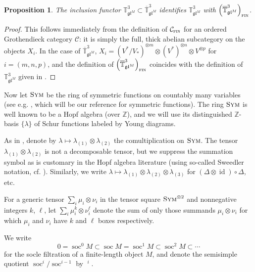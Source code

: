\documentclass[11pt]{article}
\theoremstyle{plain}
\newtheorem{proposition}[lemma]{Proposition}
\theoremstyle{nonumberplain}
\theoremstyle{plain}
\theoremstyle{nonumberplain}
\newtheorem{proof}{Proof}
\newcommand\bT{{\mathbb T}}
\newcommand\bZ{{\mathbb Z}}
\newcommand\cC{{\mathcal C}}
\newcommand\fgl{\mathfrak{gl}}
\newcommand\ol{\overline}
\DeclareMathOperator{\id}{id}
\DeclareMathOperator{\soc}{\mathrm{soc}}
\DeclareMathOperator{\usoc}{\underline{\mathrm{soc}}}
\DeclareMathOperator{\fin}{\cat{fin}}
\DeclareMathOperator{\sym}{\cat{Sym}}
\newcommand{\cat}[1]{\textsc{#1}}
\begin{document}
\begin{proposition}
	The inclusion functor $\bT^3_{\fgl^M}\subset \ol{\bT}^3_{\fgl^M}$ identifies $\bT^3_{\fgl^M}$ with $\left(\ol{\bT}^3_{\fgl^M}\right)_{\fin}$.
\end{proposition}
\begin{proof}
  This follows immediately from the definition of $\cC_{\fin}$ for an ordered Grothendieck category $\cC$: it is simply the full, thick abelian subcategory on the objects $X_i$.  In the case of $\ol{\bT}_{\fgl^M}^3$, $X_i=(V^*/V_*)^{\otimes m}\otimes (V^*)^{\otimes n}\otimes V^{\otimes p}$ for $i=(m,n,p)$, and the definition of $\left(\ol{\bT}^3_{\fgl^M}\right)_{\fin}$ coincides with the definition of $\bT^3_{\fgl^M}$ given in . %
\end{proof}

















Now let $\sym$ be the ring of symmetric functions on countably many variables (see e.g. \cite{sym}, which will be our reference for symmetric functions). The ring $\sym$ is well known to be a Hopf algebra (over $\bZ$), and we will use its distinguished $\bZ$-basis $\{\lambda\}$ of Schur functions labeled by Young diagrams. 
 

As in \cite{Chi14}, denote by $\lambda\mapsto \lambda_{(1)}\otimes\lambda_{(2)}$ the comultiplication on $\sym$. %
The tensor $\lambda_{(1)}\otimes\lambda_{(2)}$ is not a decomposable tensor, but we suppress the summation symbol as is customary in the Hopf algebra literature (using so-called Sweedler notation, cf. \cite{Sweedler}). Similarly, we write $\lambda\mapsto \lambda_{(1)}\otimes \lambda_{(2)}\otimes \lambda_{(3)}$ for $(\Delta\otimes\id)\circ\Delta$, etc.

For a generic tensor $\sum_i \mu_i\otimes \nu_i$ in the tensor square $\cat{Sym}^{\otimes 2}$ and nonnegative integers $k$, $\ell$, let $\sum_i\mu^k_i\otimes\nu^\ell_i$ denote the sum of only those summands $\mu_i\otimes\nu_i$ for which $\mu_i$ and $\nu_i$ have $k$ and $\ell$ boxes respectively. 

We write
\begin{equation*}
  0=\soc^0M\subset\soc M=\soc^1M\subset\soc^2M \subset\cdots
\end{equation*}
for the socle filtration of a finite-length object $M$, and denote the semisimple quotient $\soc^i/\soc^{i-1}$ by $\usoc^i$. 
\end{document}
